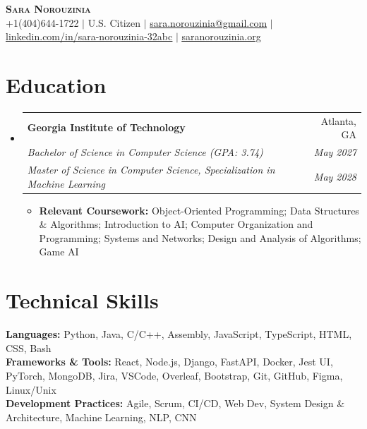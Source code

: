 \documentclass[letterpaper,10.5pt]{article}
\makeatletter
\newcommand{\resumeSubheading}[6]{
  \vspace{-1pt}\item
    \begin{tabular*}{0.97\textwidth}[t]{l@{\extracolsep{\fill}}r}
      \textbf{#1} & #2 \\
      \textit{\small#3} & \textit{\small #4} \\
      \textit{\small#5} & \textit{\small #6} \\
    \end{tabular*}\vspace{-5pt}
}
\newcommand{\resumeSubHeadingListStart}{\begin{itemize}[leftmargin=0.15in, label={}]}
\newcommand{\resumeSubHeadingListEnd}{\end{itemize}}
\makeatother
\begin{document}
\begin{center}
    \textbf{\LARGE \scshape Sara Norouzinia} \\ \vspace{1pt}
    \small +1(404)644-1722 $|$ 
    \small U.S. Citizen $|$
    \href{mailto:sara.norouzinia@gmail.com}{\underline{sara.norouzinia@gmail.com}} $|$ 
    \href{https://www.linkedin.com/in/sara-norouzinia-32abc}{\underline{linkedin.com/in/sara-norouzinia-32abc}} $|$
    \href{http://saranorouzinia.org}
    {\underline{saranorouzinia.org}}
\end{center}

\section{\textbf{Education}}
  \resumeSubHeadingListStart
    \resumeSubheading
      {Georgia Institute of Technology}{Atlanta, GA}
      {Bachelor of Science in Computer Science (GPA: 3.74)}{May 2027}
      {Master of Science in Computer Science, Specialization in Machine Learning}{May 2028}
      {\begin{itemize}[leftmargin=*,nosep]
          \item \textbf{Relevant Coursework:} Object-Oriented Programming; Data Structures \& Algorithms; Introduction to AI; Computer Organization and Programming; Systems and Networks; Design and Analysis of Algorithms; Game AI
      \end{itemize}}
  \resumeSubHeadingListEnd

\section{\textbf{Technical Skills}}
 \begin{itemize}[leftmargin=0.15in, label={}]
    \small{\item{
     \textbf{Languages:} Python, Java, C/C++, Assembly, JavaScript, TypeScript, HTML, CSS, Bash \\
    \textbf{Frameworks \& Tools:} React, Node.js, Django, FastAPI, Docker, Jest UI, PyTorch, MongoDB, Jira, VSCode, Overleaf, Bootstrap, Git, GitHub, Figma, Linux/Unix \\
    \textbf{Development Practices:} Agile, Scrum, CI/CD, Web Dev, System Design \& Architecture, Machine Learning, NLP, CNN \\
    }}
 \end{itemize}
 
\end{document}
